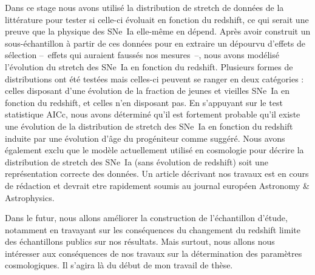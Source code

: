 \documentclass[a4paper, 12pt, svgnames]{article}
\begin{document}
Dans ce stage nous avons utilisé la distribution de stretch de données de la
littérature pour tester si celle-ci évoluait en fonction du redshift, ce qui
serait une preuve que la physique des SNe~Ia elle-même en dépend. Après avoir
construit un sous-échantillon à partir de ces données pour en extraire un
dépourvu d'effets de sélection --~effets qui auraient faussés nos mesures~--,
nous avons modélisé l'évolution du stretch des SNe~Ia en fonction du redshift.
Plusieurs formes de distributions ont été testées mais celles-ci peuvent se
ranger en deux catégories : celles disposant d'une évolution de la fraction de
jeunes et vieilles SNe~Ia en fonction du redshift, et celles n'en disposant pas.
En s'appuyant sur le test statistique AICc, nous avons déterminé qu'il est
fortement probable qu'il existe une évolution de la distribution de stretch des
SNe~Ia en fonction du redshift induite par une évolution d'âge du progéniteur
comme suggéré. Nous avons également exclu que le modèle actuellement utilisé en
cosmologie pour décrire la distribution de stretch des SNe~Ia (sans évolution de
redshift) soit une représentation correcte des données. Un article décrivant nos
travaux est en cours de rédaction et devrait etre rapidement soumis au journal
européen Astronomy \& Astrophysics. \bigbreak

Dans le futur, nous allons améliorer la construction de l'échantillon d'étude,
notamment en travayant sur les conséquences du changement du redshift limite
des échantillons publics sur nos résultats. Mais surtout, nous allons nous
intéresser aux conséquences de nos travaux sur la détermination des paramètres
cosmologiques. Il s'agira là du début de mon travail de thèse.

%
%
\end{document}
